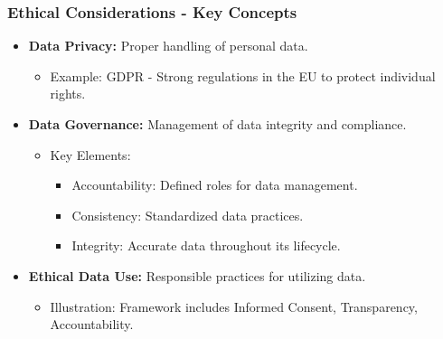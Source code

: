 \documentclass[aspectratio=169]{beamer}
\begin{document}
\begin{frame}[fragile]
    \frametitle{Ethical Considerations - Key Concepts}
    \begin{itemize}
        \item \textbf{Data Privacy:} Proper handling of personal data.
            \begin{itemize}
                \item Example: GDPR - Strong regulations in the EU to protect individual rights.
            \end{itemize}
        \item \textbf{Data Governance:} Management of data integrity and compliance.
            \begin{itemize}
                \item Key Elements:
                \begin{itemize}
                    \item Accountability: Defined roles for data management.
                    \item Consistency: Standardized data practices.
                    \item Integrity: Accurate data throughout its lifecycle.
                \end{itemize}
            \end{itemize}
        \item \textbf{Ethical Data Use:} Responsible practices for utilizing data.
            \begin{itemize}
                \item Illustration: Framework includes Informed Consent, Transparency, Accountability.
            \end{itemize}
    \end{itemize}
\end{frame}
\end{document}
